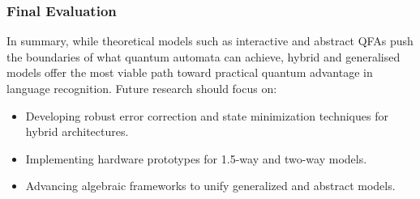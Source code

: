 \subsubsection{Final Evaluation}
In summary, while theoretical models such as interactive and abstract QFAs push the boundaries of what quantum automata can achieve, hybrid and generalised models offer the most viable path toward practical quantum advantage in language recognition. Future research should focus on:
\begin{itemize}
    \item Developing robust error correction and state minimization techniques for hybrid architectures.
    \item Implementing hardware prototypes for 1.5-way and two-way models.
    \item Advancing algebraic frameworks to unify generalized and abstract models.
\end{itemize}

